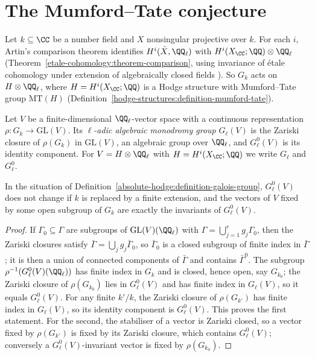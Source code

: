 \section{The Mumford--Tate conjecture}\label{absolute-hodge:section-mumford-tate}

Let $k \subseteq \CC$ be a number field and $X$ nonsingular projective over $k$. For each $i$, Artin's comparison theorem identifies $H^i(\bar X, \QQ_\ell)$ with $H^i(X_\CC; \QQ) \otimes \QQ_\ell$
(Theorem~\ref{etale-cohomology:theorem-comparison}, using invariance of \'etale cohomology under extension of algebraically closed fields \cite{milne-etale}). So $G_k$ acts on $H \otimes \QQ_\ell$, where
$H = H^i(X_\CC; \QQ)$ is a Hodge structure with Mumford--Tate group $\mathrm{MT}(H)$ (Definition~\ref{hodge-structures:definition-mumford-tate}).

\begin{definition}\label{absolute-hodge:definition-galois-group}
Let $V$ be a finite-dimensional $\QQ_\ell$-vector space with a continuous representation $\rho \colon G_k \to \mathrm{GL}(V)$. Its \emph{$\ell$-adic algebraic monodromy group} $G_\ell(V)$ is the Zariski closure of
$\rho(G_k)$ in $\mathrm{GL}(V)$, an algebraic group over $\QQ_\ell$, and $G_\ell^0(V)$ is its identity component. For $V = H \otimes \QQ_\ell$ with $H = H^i(X_\CC; \QQ)$ we write $G_\ell$ and $G_\ell^0$.
\end{definition}

\begin{lemma}\label{absolute-hodge:lemma-identity-component}
In the situation of Definition~\ref{absolute-hodge:definition-galois-group}, $G_\ell^0(V)$ does not change if $k$ is replaced by a finite extension, and the vectors of $V$ fixed by some open subgroup of $G_k$ are
exactly the invariants of $G_\ell^0(V)$.
\end{lemma}

\begin{proof}
If $\Gamma_0 \subseteq \Gamma$ are subgroups of $\mathrm{GL}(V)(\QQ_\ell)$ with $\Gamma = \bigcup_{j=1}^rg_j\Gamma_0$, then the Zariski closures satisfy $\bar\Gamma = \bigcup_jg_j\bar\Gamma_0$, so $\bar\Gamma_0$ is a closed subgroup of finite index
in $\bar\Gamma$; it is then a union of connected components of $\bar\Gamma$ and contains $\bar\Gamma^0$. The subgroup $\rho^{-1}(G_\ell^0(V)(\QQ_\ell))$ has finite index in $G_k$ and is closed, hence open, say $G_{k_0}$; the Zariski
closure of $\rho(G_{k_0})$ lies in $G_\ell^0(V)$ and has finite index in $G_\ell(V)$, so it equals $G_\ell^0(V)$. For any finite $k'/k$, the Zariski closure of $\rho(G_{k'})$ has finite index in $G_\ell(V)$, so its identity
component is $G_\ell^0(V)$. This proves the first statement. For the second, the stabiliser of a vector is Zariski closed, so a vector fixed by $\rho(G_{k'})$ is fixed by its Zariski closure, which contains $G_\ell^0(V)$;
conversely a $G_\ell^0(V)$-invariant vector is fixed by $\rho(G_{k_0})$.
\end{proof}

